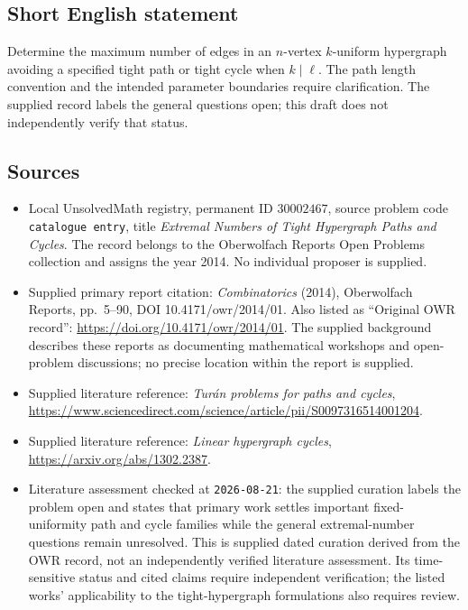 \documentclass[11pt]{article}
\begin{document}
\subsection{Short English statement}
Determine the maximum number of edges in an \(n\)-vertex \(k\)-uniform hypergraph avoiding a specified tight path or tight cycle when \(k\mid\ell\). The path length convention and the intended parameter boundaries require clarification. The supplied record labels the general questions open; this draft does not independently verify that status.
\subsection{Sources}
\begin{itemize}
\item Local UnsolvedMath registry, permanent ID \(30002467\), source problem code \texttt{catalogue entry}, title \emph{Extremal Numbers of Tight Hypergraph Paths and Cycles}. The record belongs to the Oberwolfach Reports Open Problems collection and assigns the year 2014. No individual proposer is supplied.
\item Supplied primary report citation: \emph{Combinatorics} (2014), Oberwolfach Reports, pp.~5--90, DOI 10.4171/owr/2014/01. Also listed as ``Original OWR record'': \url{https://doi.org/10.4171/owr/2014/01}. The supplied background describes these reports as documenting mathematical workshops and open-problem discussions; no precise location within the report is supplied.
\item Supplied literature reference: \emph{Tur\'an problems for paths and cycles}, \url{https://www.sciencedirect.com/science/article/pii/S0097316514001204}.
\item Supplied literature reference: \emph{Linear hypergraph cycles}, \url{https://arxiv.org/abs/1302.2387}.
\item Literature assessment checked at \texttt{2026-08-21}: the supplied curation labels the problem open and states that primary work settles important fixed-uniformity path and cycle families while the general extremal-number questions remain unresolved. This is supplied dated curation derived from the OWR record, not an independently verified literature assessment. Its time-sensitive status and cited claims require independent verification; the listed works' applicability to the tight-hypergraph formulations also requires review.
\end{itemize}
\end{document}
